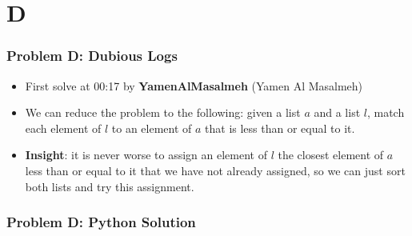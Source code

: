 \section{D}%
\label{sec:d}

\begin{frame}
  \frametitle{Problem D: Dubious Logs}

  \begin{itemize}
    \item First solve at 00:17 by \textbf{YamenAlMasalmeh} (Yamen Al Masalmeh)
    \item We can reduce the problem to the following: given a list $a$ and a list $l$,
      match each element of $l$ to an element of $a$ that is less than or equal to it.
    \item \textbf{Insight}: it is never worse to assign an element of $l$ the closest
      element of $a$ less than or equal to it that we have not already assigned, so we
      can just sort both lists and try this assignment.
  \end{itemize}
\end{frame}
\begin{frame}
  \frametitle{Problem D: Python Solution}
\end{frame}
